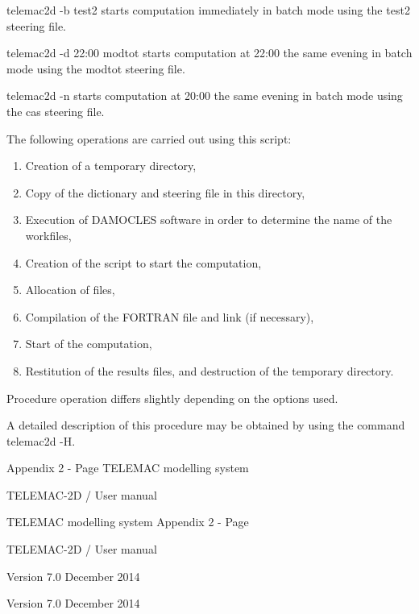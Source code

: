 \documentclass{article} %
\begin{document}
 telemac2d -b test2 starts computation immediately in batch mode using the test2 steering file.

 telemac2d -d 22:00 modtot starts computation at 22:00 the same evening in batch mode using the modtot steering file.

 telemac2d -n starts computation at 20:00 the same evening in batch mode using the cas steering file.



 The following operations are carried out using this script:

\begin{enumerate}
\item  Creation of a temporary directory,

\item  Copy of the dictionary and steering file in this directory,

\item  Execution of DAMOCLES software in order to determine the name of the workfiles,

\item  Creation of the script to start the computation,

\item  Allocation of files,

\item  Compilation of the FORTRAN file and link (if necessary),

\item  Start of the computation,

\item  Restitution of the results files, and destruction of the temporary directory.
\end{enumerate}



 Procedure operation differs slightly depending on the options used.

 A detailed description of this procedure may be obtained by using the command telemac2d -H.

 Appendix 2 - Page   TELEMAC modelling system

 TELEMAC-2D / User manual



 TELEMAC modelling system Appendix 2 - Page

 TELEMAC-2D / User manual



 Version 7.0 December 2014

 Version 7.0 December 2014
\end{document}
